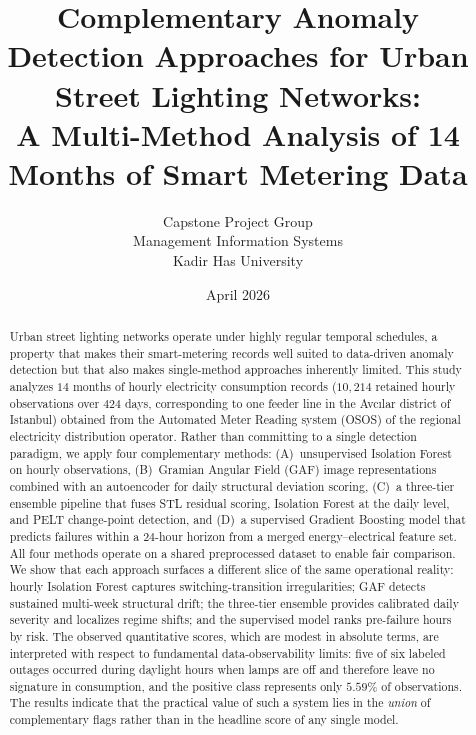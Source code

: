 \documentclass[11pt]{article}
\title{Complementary Anomaly Detection Approaches for Urban Street Lighting Networks:\\
A Multi-Method Analysis of 14 Months of Smart Metering Data}
\author{%
  Capstone Project Group\\
  Management Information Systems\\
  Kadir Has University
}
\date{April 2026}
\begin{document}
\maketitle

\begin{abstract}
Urban street lighting networks operate under highly regular temporal schedules, a property that makes their smart-metering records well suited to data-driven anomaly detection but that also makes single-method approaches inherently limited. This study analyzes $14$ months of hourly electricity consumption records ($10{,}214$ retained hourly observations over $424$ days, corresponding to one feeder line in the Avc{\i}lar district of Istanbul) obtained from the Automated Meter Reading system (OSOS) of the regional electricity distribution operator. Rather than committing to a single detection paradigm, we apply four complementary methods: (A)~unsupervised Isolation Forest on hourly observations, (B)~Gramian Angular Field (GAF) image representations combined with an autoencoder for daily structural deviation scoring, (C)~a three-tier ensemble pipeline that fuses STL residual scoring, Isolation Forest at the daily level, and PELT change-point detection, and (D)~a supervised Gradient Boosting model that predicts failures within a $24$-hour horizon from a merged energy--electrical feature set. All four methods operate on a shared preprocessed dataset to enable fair comparison. We show that each approach surfaces a different slice of the same operational reality: hourly Isolation Forest captures switching-transition irregularities; GAF detects sustained multi-week structural drift; the three-tier ensemble provides calibrated daily severity and localizes regime shifts; and the supervised model ranks pre-failure hours by risk. The observed quantitative scores, which are modest in absolute terms, are interpreted with respect to fundamental data-observability limits: five of six labeled outages occurred during daylight hours when lamps are off and therefore leave no signature in consumption, and the positive class represents only $5.59\%$ of observations. The results indicate that the practical value of such a system lies in the \emph{union} of complementary flags rather than in the headline score of any single model.
\end{abstract}

\end{document}
